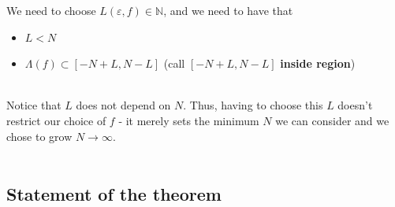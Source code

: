 \documentclass{beamer}
\begin{document}
\begin{frame}
    We need to choose $L(\varepsilon, f) \in \mathbb{N}$, and we need to have that
    \begin{itemize}
        \item $L < N$
        \item $\Lambda(f) \subset [-N+L, N-L]$ (call $[-N+L, N-L]$ \textbf{inside region})
    \end{itemize}
    ~\\
     Notice that $L$ does not depend on $N$. Thus, having to choose this $L$ doesn't restrict our choice of $f$ - it merely sets the minimum
     $N$ we can consider and we chose to grow $N \rightarrow \infty$.
    \\~\\
\end{frame}

\subsection{Statement of the theorem} %
\end{document}
